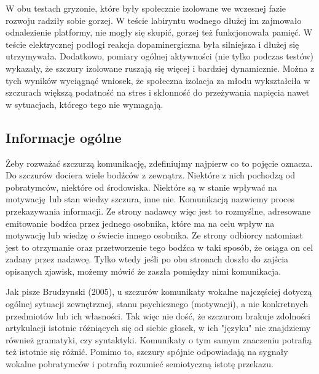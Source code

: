 \documentclass{psychol}
\begin{document}
W obu testach gryzonie, które były społecznie izolowane we wczesnej fazie rozwoju radziły sobie gorzej. W teście labiryntu wodnego dłużej im zajmowało odnalezienie platformy, nie mogły się skupić, gorzej też funkcjonowała pamięć. W teście elektrycznej podłogi reakcja dopaminergiczna była silniejsza i dłużej się utrzymywała. Dodatkowo, pomiary ogólnej aktywności (nie tylko podczas testów) wykazały, że szczury izolowane ruszają się więcej i bardziej dynamicznie. Można z tych wyników wyciągnąć wniosek, że społeczna izolacja za młodu wykształciła w szczurach większą podatność na stres i skłonność do przeżywania napięcia nawet w sytuacjach, którego tego nie wymagają.


\subsection{Informacje ogólne}

Żeby rozważać szczurzą komunikację, zdefiniujmy najpierw co to pojęcie oznacza. Do szczurów dociera wiele bodźców z zewnątrz. Niektóre z nich pochodzą od pobratymców, niektóre od środowiska. Niektóre są w stanie wpływać na motywację lub stan wiedzy szczura, inne nie. Komunikacją nazwiemy proces przekazywania informacji. Ze strony nadawcy więc jest to rozmyślne, adresowane emitowanie bodźca przez jednego osobnika, które ma na celu wpływ na motywację lub wiedzę o świecie innego osobnika. Ze strony odbiorcy natomiast jest to otrzymanie oraz przetworzenie tego bodźca w taki sposób, że osiąga on cel zadany przez nadawcę. Tylko wtedy jeśli po obu stronach doszło do zajścia opisanych zjawisk, możemy mówić że zaszła pomiędzy nimi komunikacja.

Jak pisze Brudzynski (2005), u szczurów komunikaty wokalne najczęściej dotyczą ogólnej sytuacji zewnętrznej, stanu psychicznego (motywacji), a nie konkretnych przedmiotów lub ich własności. Tak więc nie dość, że szczurom brakuje zdolności artykulacji istotnie różniących się od siebie głosek, w ich "języku" nie znajdziemy również gramatyki, czy syntaktyki. Komunikaty o tym samym znaczeniu potrafią też istotnie się różnić. Pomimo to, szczury spójnie odpowiadają na sygnały wokalne pobratymców i potrafią rozumieć semiotyczną istotę przekazu.
\end{document}
